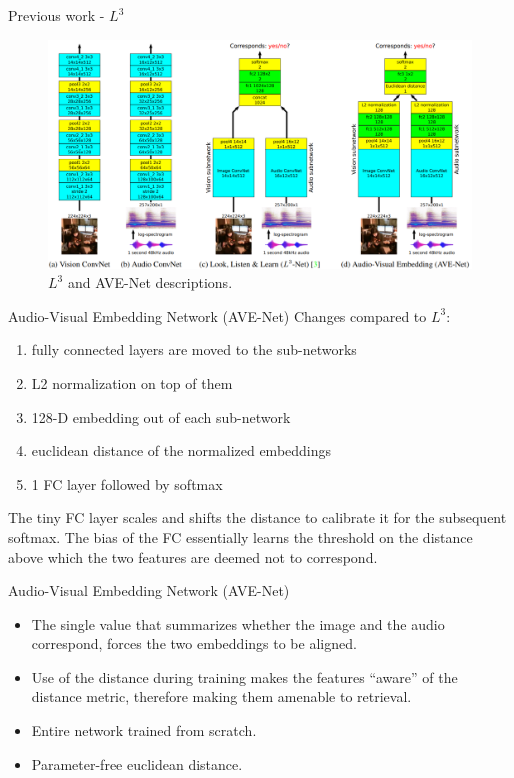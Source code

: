 \documentclass{beamer}
\begin{document}
\begin{frame}{Previous work - $L^3$}
\begin{figure}[h]
\includegraphics[width=\textwidth]{img/ave-net}
\caption{$L^3$ and AVE-Net descriptions.}
\end{figure}

\end{frame}
\begin{frame}{Audio-Visual Embedding Network (AVE-Net)}
Changes compared to $L^3$:
\begin{enumerate}
\item fully connected layers are moved to the sub-networks
\item L2 normalization on top of them
\item 128-D embedding out of each sub-network
\item euclidean distance of the normalized embeddings
\item 1 FC layer followed by softmax 
\end{enumerate}

\vfill

The tiny FC layer scales and shifts the distance to
calibrate it for the subsequent softmax. The bias of the FC
essentially learns the threshold on the distance above which
the two features are deemed not to correspond.
\end{frame}
\begin{frame}{Audio-Visual Embedding Network (AVE-Net)}

\begin{itemize}
\item The single
value that summarizes whether the image and the audio correspond,
forces the two embeddings to be aligned.
\item Use of the distance during training makes the features “aware” of the distance metric,
therefore making them amenable to retrieval.
\item Entire network trained from scratch.
\item Parameter-free euclidean distance.
\end{itemize}


\end{frame}
\end{document}
